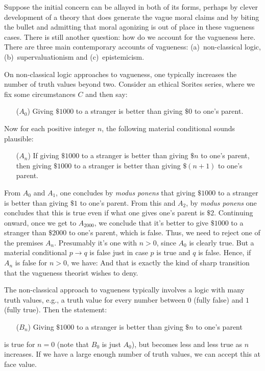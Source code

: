 Suppose the initial concern can be allayed in both of its forms, perhaps by clever development of a theory that does generate
the vague moral claims and by biting the bullet and admitting that moral agonizing is out of place in these vagueness cases. 
There is still another question: how do we account for the vagueness here. There are three main contemporary accounts of vagueness:
(a)~non-classical logic, (b)~supervaluationism and (c)~epistemicism. 

On non-classical logic approaches to vagueness, one typically increases the number of truth values beyond two. 
Consider an ethical Sorites
series, where we fix some circumstances $C$ and then say:
\begin{itemize}
\item[($A_0$)] Giving $ \$1000$ to a stranger is better than giving $ \$0$ to one's parent.
\end{itemize}

Now for each positive integer $n$, the following material conditional sounds plausible:
\begin{itemize}
\item[($A_n$)] If giving $ \$1000$ to a stranger is better than giving $ \$n$ to one's parent, then giving  $ \$1000$ to a stranger is 
    better than giving $ \$(n+1)$ to one's parent.
\end{itemize}

From $A_0$ and $A_1$, one concludes by \textit{modus ponens} that giving $ \$1000$ to a stranger is better than giving $ \$1$ to one's parent.
From this and $A_2$, by \textit{modus ponens} one concludes that this is true even if what one gives one's parent is $ \$2$. Continuing onward,
once we get to $A_{2000}$, we conclude that it's better to give $ \$1000$ to a stranger than $ \$2000$ to one's parent, which is false. Thus,
we need to reject one of the premises $A_n$. Presumably it's one with $n>0$, since $A_0$ is clearly true. But a material conditional
$p\rightarrow q$ is false just in case $p$ is true and $q$ is false. Hence, if $A_n$ is false for $n>0$, we have:
And that is exactly the kind of sharp transition that the vagueness theorist wishes to deny.

The non-classical approach to vagueness typically involves a logic with many truth values, e.g., a truth value for every number between
$0$ (fully false) and $1$ (fully true). Then the statement:
\begin{itemize}
\item[($B_n$)] Giving $ \$1000$ to a stranger is better than giving $ \$n$ to one's parent 
\end{itemize}
is true for $n=0$ (note that $B_0$ is just $A_0$), but becomes less and less true as $n$ increases. If we have a large enough number of
truth values, we can accept this at face value.

